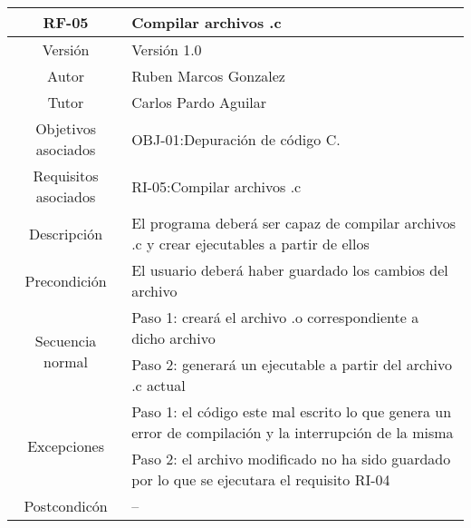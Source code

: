 \begin{table}[h!]
\centering
\begin{tabular}[c]{|c|m{10cm}|}
\hline
RF-05 & Compilar archivos .c \\
\hline
\hline
Versión & Versión 1.0 \\
\hline
Autor & Ruben Marcos Gonzalez \\
\hline
Tutor & Carlos Pardo Aguilar \\
\hline
Objetivos asociados & OBJ-01:Depuración de código C. \\
\hline
Requisitos asociados & RI-05:Compilar archivos .c \\
\hline
Descripción & El programa deberá ser capaz de compilar archivos .c y crear ejecutables a partir de ellos \\
\hline
Precondición & El usuario deberá haber guardado los cambios del archivo \\
\hline
\multirow{2}{*}{Secuencia normal} & Paso 1: creará el archivo .o correspondiente a dicho archivo \\
\hline
& Paso 2: generará un ejecutable a partir del archivo .c actual \\
\hline
\multirow{2}{*}{Excepciones} & Paso 1: el código este mal escrito lo que genera un error de compilación y la interrupción de la misma \\
\hline
& Paso 2: el archivo modificado no ha sido guardado por lo que se ejecutara el requisito RI-04 \\
\hline
Postcondicón & -- \\
\hline
\end{tabular}
\end{table}
